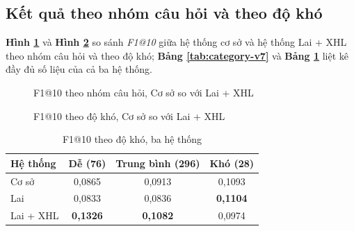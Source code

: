 \subsection{Kết quả theo nhóm câu hỏi và theo độ khó}

\textbf{Hình \ref{fig:v7-category}} và \textbf{Hình \ref{fig:v7-difficulty}} so sánh \textit{F1@10} giữa hệ thống cơ sở và hệ thống Lai + XHL theo nhóm câu hỏi và theo độ khó; \textbf{Bảng \ref{tab:category-v7}} và \textbf{Bảng \ref{tab:difficulty-v7}} liệt kê đầy đủ số liệu của cả ba hệ thống.

\begin{figure}[ht]
    \centering
    
    \caption{F1@10 theo nhóm câu hỏi, Cơ sở so với Lai + XHL}
    \label{fig:v7-category}
\end{figure}

\begin{table}[ht]
    \centering
    \caption{F1@10 theo nhóm câu hỏi, ba hệ thống}
    \label{tab:category-v7}
\end{table}

\begin{figure}[ht]
    \centering
    
    \caption{F1@10 theo độ khó, Cơ sở so với Lai + XHL}
    \label{fig:v7-difficulty}
\end{figure}

\begin{table}[ht]
    \centering
    \caption{F1@10 theo độ khó, ba hệ thống}
    \label{tab:difficulty-v7}
    \begin{tabular}{|l|c|c|c|}
        \hline
        \textbf{Hệ thống} & \textbf{Dễ (76)} & \textbf{Trung bình (296)} & \textbf{Khó (28)} \\
        \hline
        Cơ sở             & 0,0865           & 0,0913                    & 0,1093            \\
        \hline
        Lai               & 0,0833           & 0,0836                    & \textbf{0,1104}   \\
        \hline
        Lai + XHL         & \textbf{0,1326}  & \textbf{0,1082}           & 0,0974            \\
        \hline
    \end{tabular}
\end{table}

